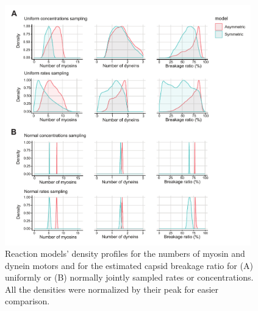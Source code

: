 \begin{figure}
\begin{center}
\includegraphics[width=0.95\textwidth, trim={0cm 0cm 0cm 0cm}, clip]{D_chapters/2_ReactionModel/densitiesRCsupplementary.pdf}
\caption[Molecular motor and capsid breakage density distributions based on joined sampling of rates or concentrations]%
{Reaction models' density profiles for the numbers of myosin and dynein motors and for the estimated capsid breakage ratio for (A) uniformly or (B) normally jointly sampled rates or concentrations. All the densities were normalized by their peak for easier comparison.}
\label{figure:densitiesRCsupplementary}
\end{center}
\end{figure}

